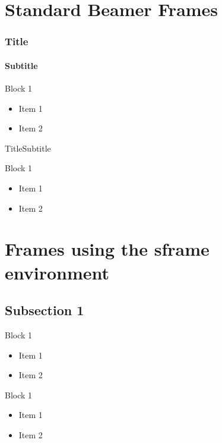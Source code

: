 \documentclass{beamer}
\begin{document}
\section*{Standard Beamer Frames}

    \begin{frame}
        \frametitle{Title}
        \framesubtitle{Subtitle}
        \begin{block}{Block 1}
            \begin{itemize}
                \item Item 1
                \item Item 2
            \end{itemize}
        \end{block}
    \end{frame}

    \begin{frame}{Title}{Subtitle}
        \begin{block}{Block 1}
            \begin{itemize}
                \item Item 1
                \item Item 2
            \end{itemize}
        \end{block}
    \end{frame}

\section*{Frames using the sframe environment}

\subsection*{Subsection 1}

    \begin{sframe}
        \begin{block}{Block 1}
            \begin{itemize}
                \item Item 1
                \item Item 2
            \end{itemize}
        \end{block}
    \end{sframe}

    \begin{sframe}[Subtitle]
        \begin{block}{Block 1}
            \begin{itemize}
                \item Item 1
                \item Item 2
            \end{itemize}
        \end{block}
    \end{sframe}
\end{document}
